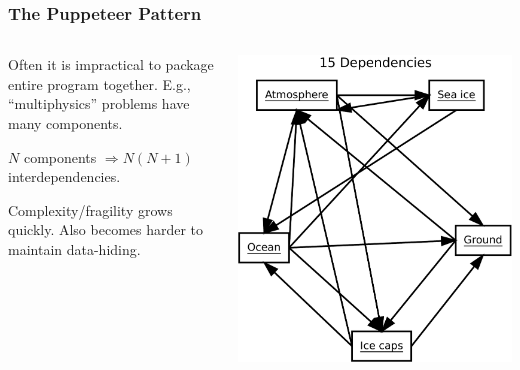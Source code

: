 \documentclass[12pt]{beamer}
\begin{document}
\begin{frame}
  \frametitle{The Puppeteer Pattern}
  \begin{columns}
    \begin{column}{0.55\textwidth}
      Often it is impractical to package entire program together. E.g.,
      ``multiphysics'' problems have many components.
      
      \vspace{3mm} $N$ components $\Rightarrow N(N+1)$
      interdependencies.

      \vspace{3mm}Complexity/fragility grows quickly. Also
      becomes harder to maintain data-hiding.
    \end{column}
    \begin{column}{0.45\textwidth}
      \includegraphics[width=\textwidth]{dependencies.pdf}
    \end{column}
  \end{columns}
\end{frame}
\end{document}
